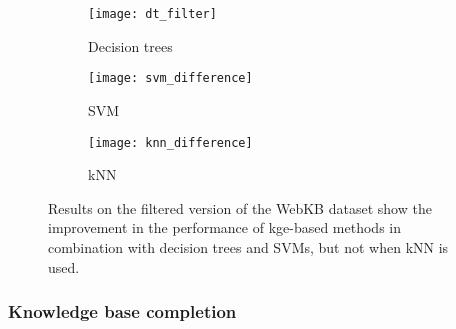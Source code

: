 \begin{figure}
	\centering
	\begin{subfigure}{0.32\linewidth}
		\centering
		\texttt{[image: dt\_filter]}
		\caption{Decision trees \label{fig:dt_difference}}
	\end{subfigure}
	\begin{subfigure}{0.32\linewidth}
		\centering
		\texttt{[image: svm\_difference]}
		\caption{SVM \label{fig:svm_difference}}
	\end{subfigure}
	\begin{subfigure}{0.32\linewidth}
		\centering
		\texttt{[image: knn\_difference]}
		\caption{kNN \label{fig:knn_difference}}
	\end{subfigure}
	\caption[Control experiment - results on the filtered version of the WebKB dataset]{Results on the filtered version of the WebKB dataset show the improvement in the performance of \gls{kge}-based methods in combination with decision trees and SVMs, but not when kNN is used.}
	\label{fig:filter_results}
\end{figure}








\subsubsection{Knowledge base completion}


\begin{table*}[h]
	\centering
	\caption{Performance on the knowledge base completion tasks}
	\label{tab:kbcres}
\end{table*}


